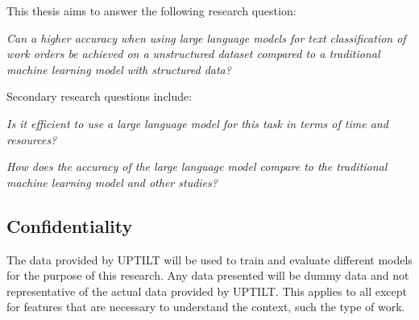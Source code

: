 This thesis aims to answer the following research question:

\bigskip
\textit{Can a higher accuracy when using large language models for
    text classification of work orders be achieved on a unstructured dataset
    compared to a traditional machine learning model with structured data?}

\bigskip
\noindent
Secondary research questions include:

\bigskip
\textit{Is it efficient to use a large language model for this task in terms of
    time and resources?}

\bigskip
\textit{How does the accuracy of the large language model compare to the
    traditional machine learning model and other studies?}

\subsection{Confidentiality}

The data provided by UPTILT will be used to train and evaluate different models
for the purpose of this research. Any data presented will be dummy data and not
representative of the actual data provided by UPTILT. This applies to all except
for features that are necessary to understand the context, such the type of
work.
